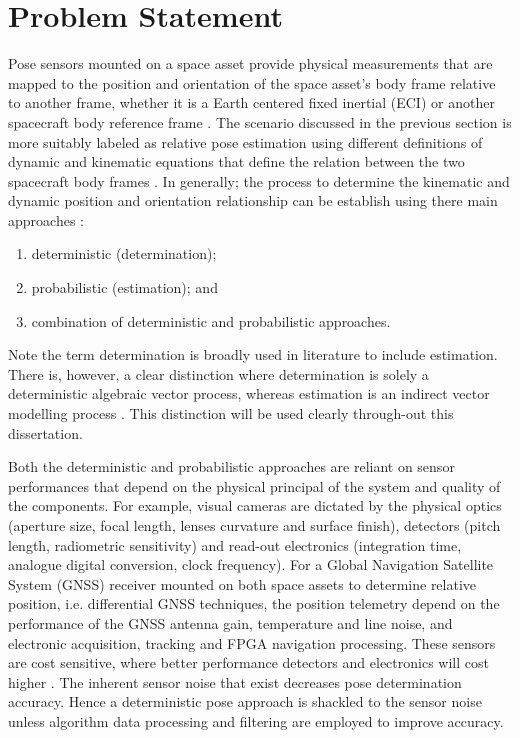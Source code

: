 \section{Problem Statement}\label{CHAP1_2}

Pose sensors mounted on a space asset provide physical measurements that are mapped to the position and orientation of the space asset's body frame relative to another frame, whether it is a Earth centered fixed inertial (ECI) or another spacecraft body reference frame \cite{PrezVillar2017SpacecraftPE}. The scenario discussed in the previous section is more suitably labeled as relative pose estimation using different definitions of dynamic and kinematic equations that define the relation between the two spacecraft body frames \cite{OpromollaPose17}.  In generally; the process to determine the kinematic and dynamic position and orientation relationship can be establish using there main approaches \cite{landisMarkleyFundamentalsOfADCSSpacecraft15}:
\begin{enumerate}
    \item deterministic (determination);
    \item probabilistic (estimation); and   
    \item combination of deterministic and probabilistic approaches. 
\end{enumerate}

Note the term determination is broadly used in literature to include estimation. There is, however, a clear distinction where determination is solely a deterministic algebraic vector process, whereas estimation is an indirect vector modelling process \cite{Dhahbane2021AttitudeDA}. This distinction will be used clearly through-out this dissertation. 

Both the deterministic and probabilistic approaches are reliant on sensor performances that depend on the physical principal of the system and quality of the components. For example, visual cameras are dictated by the physical optics (aperture size, focal length, lenses curvature and surface finish), detectors (pitch length, radiometric sensitivity) and read-out electronics (integration time, analogue digital conversion, clock frequency). For a Global Navigation Satellite System (GNSS) receiver mounted on both space assets to determine relative position, i.e. differential GNSS techniques, the position telemetry depend on the performance of the GNSS antenna gain, temperature and line noise, and electronic  acquisition, tracking and FPGA navigation processing. These sensors are cost sensitive, where better performance detectors and electronics will cost higher \cite{hashim2021attitude}. The inherent sensor noise that exist decreases pose determination accuracy. Hence a deterministic pose approach is shackled to the sensor noise unless algorithm data processing and filtering are employed to improve accuracy\cite{OpromollaPose17}.


